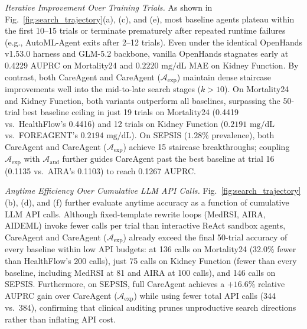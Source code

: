 \textit{Iterative Improvement Over Training Trials.}
As shown in Fig.~\ref{fig:search_trajectory}(a), (c), and (e), most baseline agents plateau within the first 10--15 trials or terminate prematurely after repeated runtime failures (e.g., AutoML-Agent exits after 2--12 trials). Even under the identical OpenHands v1.53.0 harness and GLM-5.2 backbone, vanilla OpenHands stagnates early at 0.4229 AUPRC on Mortality24 and $0.2220\text{ mg/dL}$ MAE on Kidney Function. By contrast, both CareAgent and CareAgent ($\mathcal{A}_{\text{exp}}$) maintain dense staircase improvements well into the mid-to-late search stages ($k>10$). On Mortality24 and Kidney Function, both variants outperform all baselines, surpassing the 50-trial best baseline ceiling in just 19 trials on Mortality24 (0.4419 vs.\ HealthFlow's 0.4416) and 12 trials on Kidney Function ($0.2191\text{ mg/dL}$ vs.\ FOREAGENT's $0.2194\text{ mg/dL}$). On SEPSIS ($1.28\%$ prevalence), both CareAgent and CareAgent ($\mathcal{A}_{\text{exp}}$) achieve 15 staircase breakthroughs; coupling $\mathcal{A}_{\text{exp}}$ with $\mathcal{A}_{\text{aud}}$ further guides CareAgent past the best baseline at trial 16 (0.1135 vs.\ AIRA's 0.1103) to reach 0.1267 AUPRC.

\textit{Anytime Efficiency Over Cumulative LLM API Calls.}
Fig.~\ref{fig:search_trajectory}(b), (d), and (f) further evaluate anytime accuracy as a function of cumulative LLM API calls. Although fixed-template rewrite loops (MedRSI, AIRA, AIDEML) invoke fewer calls per trial than interactive ReAct sandbox agents, CareAgent and CareAgent ($\mathcal{A}_{\text{exp}}$) already exceed the final 50-trial accuracy of every baseline within low API budgets: at 136 calls on Mortality24 (32.0\% fewer than HealthFlow's 200 calls), just 75 calls on Kidney Function (fewer than every baseline, including MedRSI at 81 and AIRA at 100 calls), and 146 calls on SEPSIS. Furthermore, on SEPSIS, full CareAgent achieves a $+16.6\%$ relative AUPRC gain over CareAgent ($\mathcal{A}_{\text{exp}}$) while using fewer total API calls (344 vs.\ 384), confirming that clinical auditing prunes unproductive search directions rather than inflating API cost.
